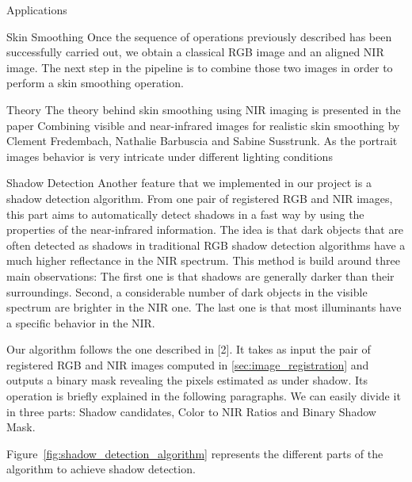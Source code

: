 \documentclass[11pt]{article}
\begin{document}
\begin{section}{Applications}

    \begin{subsection}{Skin Smoothing}
        \label{sec:skin_smoothing}
        Once the sequence of operations previously described has been successfully carried out, we obtain a classical RGB image and an aligned NIR image. The next step in the pipeline is to combine those two images in order to perform a skin smoothing operation.

        \begin{subsubsection}{Theory}
            The theory behind skin smoothing using NIR imaging is presented in the paper Combining visible and near-infrared images for realistic skin smoothing by Clement Fredembach, Nathalie Barbuscia and Sabine Susstrunk. As the portrait images behavior is very intricate under different lighting conditions
        \end{subsubsection}
    \end{subsection}


    \begin{subsection}{Shadow Detection}
        \label{sec:shadow_detection}
        Another feature that we implemented in our project is a shadow detection algorithm. From one pair of registered RGB and NIR images, this part aims to automatically detect shadows in a fast way by using the properties of the near-infrared information. The idea is that dark objects that are often detected as shadows in traditional RGB shadow detection algorithms have a much higher reflectance in the NIR spectrum. This method is build around three main observations: The first one is that shadows are generally darker than their surroundings. Second, a considerable number of dark objects in the visible spectrum are brighter in the NIR one. The last one is that most illuminants have a specific behavior in the NIR.

        \medskip

        Our algorithm follows the one described in [2]. It takes as input the pair of registered RGB and NIR images computed in \ref{sec:image_registration} and outputs a binary mask revealing the pixels estimated as under shadow. Its operation is briefly explained in the following paragraphs. We can easily divide it in three parts: Shadow candidates, Color to NIR Ratios and Binary Shadow Mask.

        \medskip

        Figure~\ref{fig:shadow_detection_algorithm} represents the different parts of the algorithm to achieve shadow detection.


\end{subsection}
\end{section}
\end{document}
